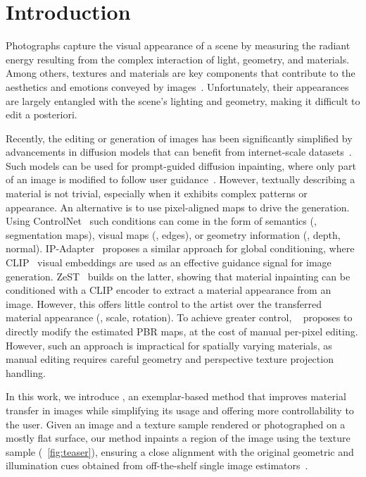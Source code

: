 \section{Introduction}

Photographs capture the visual appearance of a scene by measuring the radiant energy resulting from the complex interaction of light, geometry, and materials. Among others, textures and materials are key components that contribute to the aesthetics and emotions conveyed by images~\cite{joshi2011aesthetics}. %
Unfortunately, their appearances are largely entangled with the scene's lighting and geometry, making it difficult to edit a posteriori. 

Recently, the editing or generation of images has been significantly simplified by advancements in diffusion models that can benefit from internet-scale datasets~\cite{schuhmann2022laionb}. Such models can be used for prompt-guided diffusion inpainting, where only part of an image is modified to follow user guidance~\cite{meng2022sdedit,lugmayr2022repaint}. However, textually describing a material is not trivial, especially when it {exhibits} complex patterns or appearance. An alternative is to use pixel-aligned maps to drive the generation. 
Using ControlNet~\cite{zhang2023controlnet} such conditions can come in the form of semantics (\eg, segmentation maps), visual maps (\eg, edges), or geometry information (\eg, depth, normal). 
IP-Adapter~\cite{ye2023ipadapter} proposes a similar approach for global conditioning, where CLIP~\cite{radford2021learning} visual embeddings are used as an effective guidance signal for image generation. 
ZeST~\cite{cheng2024zest} builds on the latter, showing that material inpainting can be conditioned with a CLIP encoder to extract a material appearance from an image. However, this offers little control to the artist over the transferred material appearance (\eg, scale, rotation). 
To achieve greater control, \rgbtooxx~\cite{zeng2024rgbx} proposes to directly modify the estimated PBR maps, at the cost of manual per-pixel editing. However, such an approach is impractical for spatially varying materials, as manual editing requires careful geometry and perspective texture projection handling.

In this work, we introduce \method, an exemplar-based method that improves material transfer in images while simplifying its usage and offering more controllability to the user. 
Given an image and a texture sample rendered or photographed on a mostly flat surface, our method inpaints a region of the image using the texture sample (\cf~\cref{fig:teaser}), ensuring a close alignment with the original geometric and illumination cues obtained from off-the-shelf single image estimators~\cite{zeng2024rgbx,he2024lotus}. 

